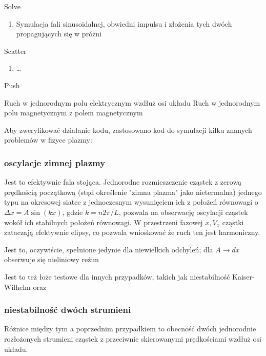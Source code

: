 {\begin{enumerate}
        \itemi Solve
            \begin{enumerate}
                \item Symulacja fali sinusoidalnej, obwiedni impulsu i złożenia tych dwóch
                    propagujących się w próżni
            \end{enumerate}

        \itemi Scatter
            \begin{enumerate}
                \item \ldots {}
            \end{enumerate}

        \itemi Push
            \begin{enumerate}
                \itemii Ruch w jednorodnym polu elektrycznym wzdłuż osi układu
                \itemii Ruch w jednorodnym polu magnetycznym z polem magnetycznym
            \end{enumerate}
    \end{enumerate}

    Aby zweryfikować działanie kodu, zastosowano kod do symulacji kilku znanych problemów w fizyce plazmy:
    \subsubsection{oscylacje zimnej plazmy}
    Jest to efektywnie fala stojąca. Jednorodne rozmieszczenie cząstek z zerową prędkością początkową (stąd określenie
    "zimna plazma" jako nietermalna)
    jednego typu na okresowej siatce z jednoczesnym wysunięciem ich z położeń równowagi o $\Delta x = A \sin(kx)$,
    gdzie $k = n 2 \pi / L$, pozwala na obserwację
    oscylacji cząstek wokół ich stabilnych położeń równowagi. W przestrzeni fazowej $x, V_x$ cząstki zataczają efektywnie
    elipsy, co pozwala wnioskować że ruch ten jest harmoniczny.

    Jest to, oczywiście, spełnione jedynie dla niewielkich odchyleń; dla $A \to dx$ 
    obserwuje się nieliniowy reżim 

    Jest to też łoże testowe 
    dla innych przypadków, takich jak niestabilność Kaiser-Wilhelm 
    oraz 
    \subsubsection{niestabilność dwóch strumieni} 
    Różnice między tym a poprzednim przypadkiem to obecność dwóch jednorodnie rozłożonych strumieni cząstek
    z przeciwnie skierowanymi prędkościami wzdłuż osi układu.

}
